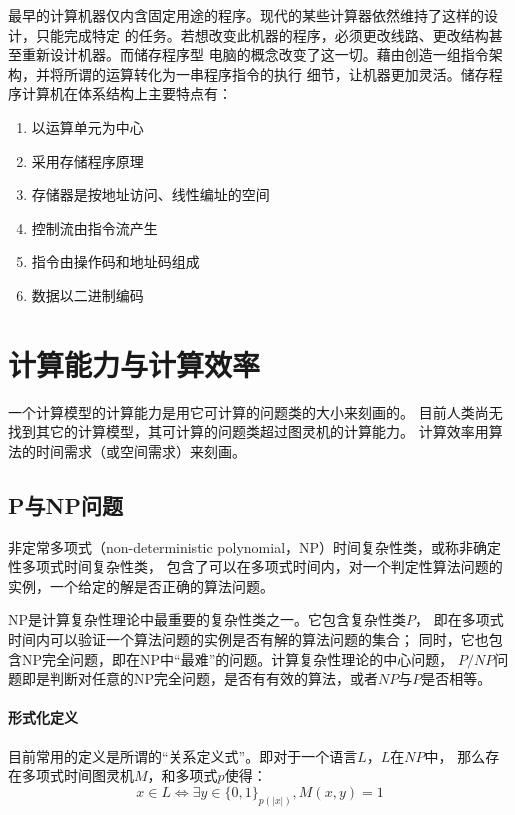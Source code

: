 最早的计算机器仅内含固定用途的程序。现代的某些计算器依然维持了这样的设计，只能完成特定
的任务。若想改变此机器的程序，必须更改线路、更改结构甚至重新设计机器。而储存程序型
电脑的概念改变了这一切。藉由创造一组指令架构，并将所谓的运算转化为一串程序指令的执行
细节，让机器更加灵活。储存程序计算机在体系结构上主要特点有：
\begin{enumerate}
        \item    以运算单元为中心
        \item    采用存储程序原理
        \item    存储器是按地址访问、线性编址的空间
        \item    控制流由指令流产生
        \item    指令由操作码和地址码组成
        \item    数据以二进制编码
\end{enumerate}

\section{计算能力与计算效率}
一个计算模型的计算能力是用它可计算的问题类的大小来刻画的。
目前人类尚无找到其它的计算模型，其可计算的问题类超过图灵机的计算能力。
计算效率用算法的时间需求（或空间需求）来刻画。

\subsection{P与NP问题}
非定常多项式（non-deterministic polynomial，NP）时间复杂性类，或称非确定性多项式时间复杂性类，
包含了可以在多项式时间内，对一个判定性算法问题的实例，一个给定的解是否正确的算法问题。

NP是计算复杂性理论中最重要的复杂性类之一。它包含复杂性类$P$，
即在多项式时间内可以验证一个算法问题的实例是否有解的算法问题的集合；
同时，它也包含NP完全问题，即在NP中“最难”的问题。计算复杂性理论的中心问题，
$ P/NP $问题即是判断对任意的NP完全问题，是否有有效的算法，或者$NP$与$P$是否相等。

\paragraph{形式化定义}
目前常用的定义是所谓的“关系定义式”。即对于一个语言$L$，$L$在$NP$中，
那么存在多项式时间图灵机$M$，和多项式$p$使得\cite{DBLP:journals/jacm/Ladner75}：
\begin{equation*}
        x \in L \iff \exists y \in \{0,1\}_{p(|x|)}, M(x,y) = 1
\end{equation*}

